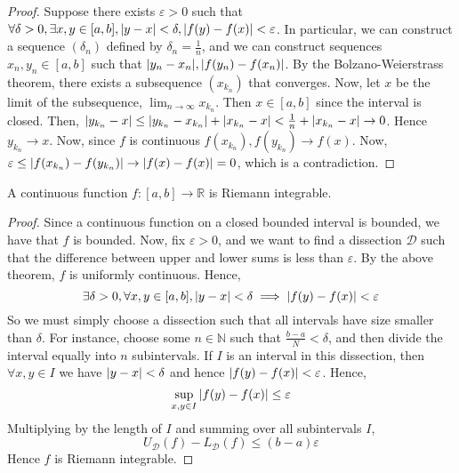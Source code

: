 \begin{proof}
	Suppose there exists \( \varepsilon > 0 \) such that \( \forall \delta > 0, \exists x,y \in [a,b], \abs{y-x} < \delta, \abs{f(y)-f(x)} < \varepsilon \).
	In particular, we can construct a sequence \( (\delta_n) \) defined by \( \delta_n = \frac{1}{n} \), and we can construct sequences \( x_n, y_n \in [a,b] \) such that \( \abs{y_n-x_n}, \abs{f(y_n) - f(x_n)} \).
	By the Bolzano-Weierstrass theorem, there exists a subsequence \( (x_{k_n}) \) that converges.
	Now, let \( x \) be the limit of the subsequence, \( \lim_{n \to \infty} x_{k_n} \).
	Then \( x \in [a,b] \) since the interval is closed.
	Then, \( \abs{y_{k_n} - x} \leq \abs{y_{k_n} - x_{k_n}} + \abs{x_{k_n} - x} < \frac{1}{n} + \abs{x_{k_n} - x} \to 0 \).
	Hence \( y_{k_n} \to x \).
	Now, since \( f \) is continuous \( f(x_{k_n}), f(y_{k_n}) \to f(x) \).
	Now, \( \varepsilon \leq \abs{f(x_{k_n}) - f(y_{k_n})} \to \abs{f(x) - f(x)} = 0 \), which is a contradiction.
\end{proof}
\begin{corollary}
	A continuous function \( f \colon [a,b] \to \mathbb R \) is Riemann integrable.
\end{corollary}
\begin{proof}
	Since a continuous function on a closed bounded interval is bounded, we have that \( f \) is bounded.
	Now, fix \( \varepsilon > 0 \), and we want to find a dissection \( \mathcal D \) such that the difference between upper and lower sums is less than \( \varepsilon \).
	By the above theorem, \( f \) is uniformly continuous.
	Hence,
	\[
		\exists \delta > 0, \forall x, y \in [a,b], \abs{y-x} < \delta \implies \abs{f(y) - f(x)} < \varepsilon
	\]
	So we must simply choose a dissection such that all intervals have size smaller than \( \delta \).
	For instance, choose some \( n \in \mathbb N \) such that \( \frac{b-a}{N} < \delta \), and then divide the interval equally into \( n \) subintervals.
	If \( I \) is an interval in this dissection, then \( \forall x,y \in I \) we have \( \abs{y-x} < \delta \) and hence \( \abs{f(y) - f(x)} < \varepsilon \).
	Hence,
	\[
		\sup_{x,y \in I} \abs{f(y) - f(x)} \leq \varepsilon
	\]
	Multiplying by the length of \( I \) and summing over all subintervals \( I \),
	\[
		U_{\mathcal D}(f) - L_{\mathcal D}(f) \leq (b-a) \varepsilon
	\]
	Hence \( f \) is Riemann integrable.
\end{proof}

